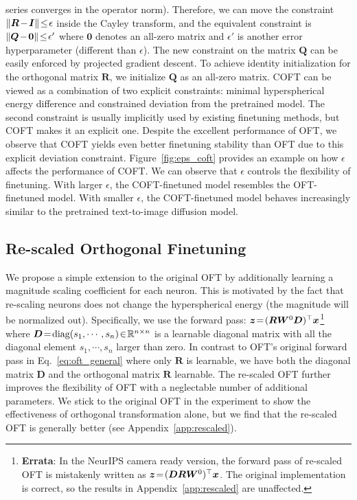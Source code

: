 \documentclass{article}
\begin{document}
\vspace{-1.625mm}

series converges in the operator norm). Therefore, we can move the constraint $\thickmuskip=2mu \medmuskip=2mu\|\bm{R}-\bm{I}\|\leq\epsilon$ inside the Cayley transform, and the equivalent constraint is $\thickmuskip=2mu \medmuskip=2mu \|\bm{Q}-\bm{0}\|\leq\epsilon'$ where $\bm{0}$ denotes an all-zero matrix and $\epsilon'$ is another error hyperparameter (different than $\epsilon$). The new constraint on the matrix $\bm{Q}$ can be easily enforced by projected gradient descent. To achieve identity initialization for the orthogonal matrix $\bm{R}$, we initialize $\bm{Q}$ as an all-zero matrix. COFT can be viewed as a combination of two explicit constraints: minimal hyperspherical energy difference and constrained deviation from the pretrained model. The second constraint is usually implicitly used by existing finetuning methods, but COFT makes it an explicit one. Despite the excellent performance of OFT, we observe that COFT yields even better finetuning stability than OFT due to this explicit deviation constraint. Figure~\ref{fig:eps_coft} provides an example on how $\epsilon$ affects the performance of COFT. We can observe that $\epsilon$ controls the flexibility of finetuning. With larger $\epsilon$, the COFT-finetuned model resembles the OFT-finetuned model. With smaller $\epsilon$, the COFT-finetuned model behaves increasingly similar to the pretrained text-to-image diffusion model.

\vspace{-1.5mm}
\subsection{Re-scaled Orthogonal Finetuning}
\vspace{-0.9mm}
We propose a simple extension to the original OFT by additionally learning a magnitude scaling coefficient for each neuron. This is motivated by the fact that re-scaling neurons does not change the hyperspherical energy (the magnitude will be normalized out). Specifically, we use the forward pass: $\thickmuskip=2mu \medmuskip=2mu\bm{z}=(\bm{R}\bm{W}^0\bm{D})^\top\bm{x}$\footnote{\textbf{Errata}: In the NeurIPS camera ready version, the forward pass of re-scaled OFT is mistakenly written as $\thickmuskip=2mu \medmuskip=2mu\bm{z}=(\bm{D}\bm{R}\bm{W}^0)^\top\bm{x}$. The original implementation is correct, so the results in Appendix~\ref{app:rescaled} are unaffected.} where $\thickmuskip=2mu \medmuskip=2mu \bm{D}=\text{diag}(s_1,\cdots,s_n)\in\mathbb{R}^{n\times n}$ is a learnable diagonal matrix with all the diagonal element $s_1,\cdots,s_n$ larger than zero. In contrast to OFT's original forward pass in Eq.~\eqref{eq:oft_general} where only $\bm{R}$ is learnable, we have both the diagonal matrix $\bm{D}$ and the orthogonal matrix $\bm{R}$ learnable. The re-scaled OFT further improves the flexibility of OFT with a neglectable number of additional parameters. We stick to the original OFT in the experiment to show the effectiveness of orthogonal transformation alone, but we find that the re-scaled OFT is generally better (see Appendix~\ref{app:rescaled}).
\end{document}
